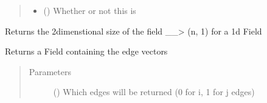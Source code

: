 \documentclass[letterpaper,10pt,english]{sphinxmanual}
\begin{document}
\begin{fulllineitems}
\begin{fulllineitems}
\begin{quote}
\begin{description}
\begin{itemize}
\item {} 
\sphinxAtStartPar
{} () \textendash{} Whether or not this is

\end{itemize}

\end{description}\end{quote}

\end{fulllineitems}


\begin{fulllineitems}
\label{\detokenize{autoapi/CellCenterWS/index:CellCenterWS.CellCenterWS.field_size}}
\sphinxAtStartPar
Returns the 2\sphinxhyphen{}dimenstional size of the field \_\_\textgreater{} (n, 1) for a 1\sphinxhyphen{}d Field

\end{fulllineitems}


\begin{fulllineitems}
\label{\detokenize{autoapi/CellCenterWS/index:CellCenterWS.CellCenterWS.edges}}
\sphinxAtStartPar
Returns a Field containing the edge vectors
\begin{quote}\begin{description}
\item[{Parameters}] \leavevmode
\sphinxAtStartPar
{} () \textendash{} Which edges will be returned (0 for i, 1 for j edges)

\end{description}\end{quote}

\end{fulllineitems}



\end{fulllineitems}
\end{document}

